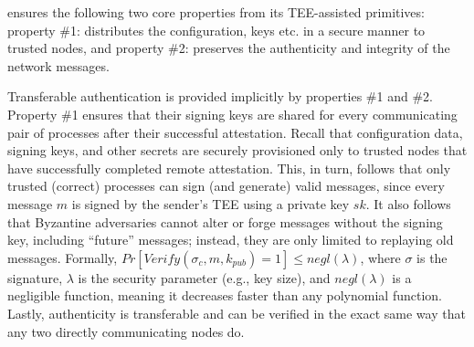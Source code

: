 

\label{transferable-authentication}
\projecttitle{} ensures the following two core properties from its TEE-assisted primitives: property \#1: \projecttitle{} distributes the configuration, keys etc. in a secure manner to trusted nodes, and property \#2: \projecttitle{} preserves the authenticity and integrity of the network messages.%

Transferable authentication is provided implicitly by properties \#1 and \#2. 
 Property \#1 ensures that their signing keys are shared for every communicating pair of processes after their successful attestation. Recall that configuration data, signing keys, and other secrets are securely provisioned only to trusted nodes that have successfully completed remote attestation. This, in turn, follows that only trusted (correct) processes can sign (and generate) valid messages, since every message $m$ is signed by the sender's TEE using a private key $sk$. It also follows that Byzantine adversaries cannot alter or forge messages without the signing key, including ``future'' messages; instead, they are only limited to replaying old messages. Formally, $Pr[Verify(\sigma_c,m,k_{pub})=1] \leq negl(\lambda)$, where $\sigma$ is the signature, $\lambda$ is the security parameter (e.g., key size), and $negl(\lambda)$ is a negligible function, meaning it decreases faster than any polynomial function. Lastly, authenticity is transferable and can be verified in the exact same way that any two directly communicating nodes do.
 
